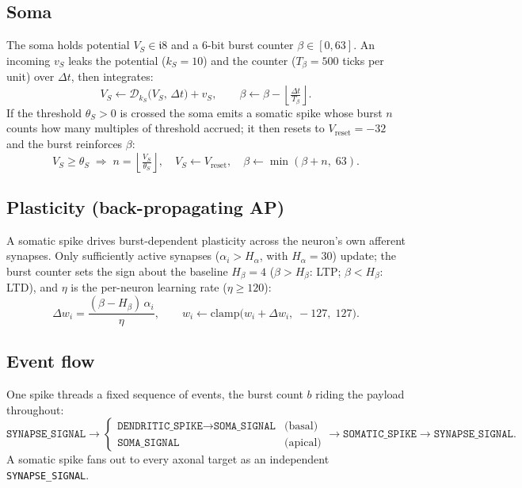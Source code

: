 \documentclass[11pt, a4paper]{article}
\begin{document}
\subsection{Soma}
The soma holds potential $V_S \in \mathfrak{i}8$ and a 6-bit burst counter $\beta \in [0, 63]$. An
incoming $v_S$ leaks the potential ($k_S = 10$) and the counter ($T_\beta = 500$ ticks per unit) over
$\Delta t$, then integrates:
\begin{equation}
    V_S \leftarrow \mathcal{D}_{k_S}\!\big(V_S,\, \Delta t\big) + v_S, \qquad
    \beta \leftarrow \beta - \left\lfloor \tfrac{\Delta t}{T_\beta} \right\rfloor.
\end{equation}
If the threshold $\theta_S > 0$ is crossed the soma emits a somatic spike whose burst $n$ counts how
many multiples of threshold accrued; it then resets to $V_{\mathrm{reset}} = -32$ and the burst
reinforces $\beta$:
\begin{equation}
    V_S \ge \theta_S \;\Longrightarrow\;
    n = \left\lfloor \tfrac{V_S}{\theta_S} \right\rfloor, \quad
    V_S \leftarrow V_{\mathrm{reset}}, \quad
    \beta \leftarrow \min(\beta + n,\; 63).
\end{equation}

\subsection{Plasticity (back-propagating AP)}
A somatic spike drives burst-dependent plasticity across the neuron's own afferent synapses. Only
sufficiently active synapses ($\alpha_i > H_\alpha$, with $H_\alpha = 30$) update; the burst counter
sets the sign about the baseline $H_\beta = 4$ ($\beta > H_\beta$: LTP; $\beta < H_\beta$: LTD), and
$\eta$ is the per-neuron learning rate ($\eta \ge 120$):
\begin{equation}
    \Delta w_i = \frac{(\beta - H_\beta)\,\alpha_i}{\eta}, \qquad
    w_i \leftarrow \mathrm{clamp}\big(w_i + \Delta w_i,\; -127,\; 127\big).
\end{equation}

\subsection{Event flow}
One spike threads a fixed sequence of events, the burst count $b$ riding the payload throughout:
\begin{equation}
    \texttt{SYNAPSE\_SIGNAL} \to
    \begin{cases}
        \texttt{DENDRITIC\_SPIKE} \to \texttt{SOMA\_SIGNAL} & \text{(basal)}\\
        \texttt{SOMA\_SIGNAL} & \text{(apical)}
    \end{cases}
    \to \texttt{SOMATIC\_SPIKE} \to \texttt{SYNAPSE\_SIGNAL}.
\end{equation}
A somatic spike fans out to every axonal target as an independent \texttt{SYNAPSE\_SIGNAL}.
\end{document}
